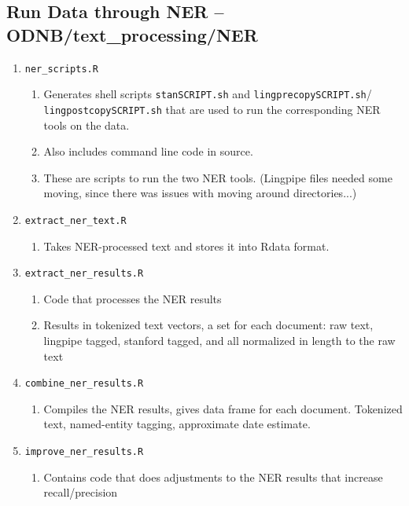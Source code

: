 \documentclass[11pt]{article}
\newcommand{\filename}[1]{ \texttt{#1}}
\begin{document}
\subsection{Run Data through NER -- ODNB/text\_processing/NER}
\begin{enumerate}

\item \filename{ner\_scripts.R} 
\begin{enumerate}
\item Generates shell scripts \filename{stanSCRIPT.sh} and \filename{lingprecopySCRIPT.sh}/\filename{lingpostcopySCRIPT.sh} that are used to run the corresponding NER tools on the data. 
\item Also includes command line code in source. 
\item These are scripts to run the two NER tools. (Lingpipe files needed some moving, since there was issues with moving around directories...)
\end{enumerate}

\item \filename{extract\_ner\_text.R}
\begin{enumerate}
\item Takes NER-processed text and stores it into Rdata format. 
\end{enumerate}

\item \filename{extract\_ner\_results.R}
\begin{enumerate}
\item Code that processes the NER results
\item Results in tokenized text vectors, a set for each document: raw text, lingpipe tagged, stanford tagged, and all normalized in length to the raw text
\end{enumerate}

\item \filename{combine\_ner\_results.R}
\begin{enumerate}
\item Compiles the NER results, gives data frame for each document. Tokenized text, named-entity tagging, approximate date estimate. 
\end{enumerate}

\item \filename{improve\_ner\_results.R}
\begin{enumerate}
\item Contains code that does adjustments to the NER results that increase recall/precision
\end{enumerate}

\end{enumerate}
\end{document}
